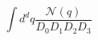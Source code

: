 \documentclass[10pt]{article}
\begin{document}
\[
\int d^dq \frac{\mathcal{N}(q)}{D_0 D_1 D_2 D_3}
\]
\end{document}
